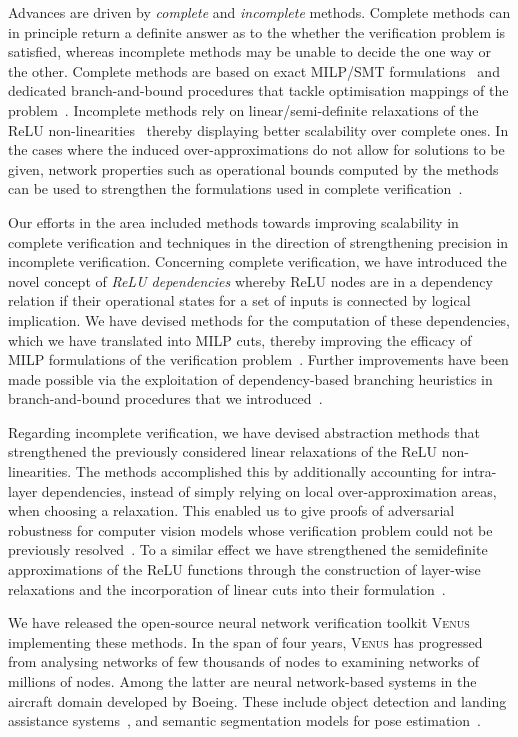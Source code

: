 \documentclass{article}
\newcommand{\venus}{\textsc{Venus}\xspace}
\begin{document}
Advances are driven by {\em complete} and {\em incomplete} methods.  Complete
methods can in principle return a definite answer as to the whether the
verification problem is satisfied, whereas incomplete methods may be unable to
decide the one way or the other. Complete methods are based on exact MILP/SMT 
formulations~\cite{Bastani+16,Katz+17} and dedicated branch-and-bound procedures
that tackle optimisation mappings of the problem~\cite{Bunel+18}.  Incomplete
methods rely on linear/semi-definite relaxations of the  ReLU
non-linearities~\cite{WongKolter17,RaghunathanSteinhardtLiang18} thereby
displaying better scalability over complete ones. In the cases where the
induced over-approximations  do not allow for solutions to be given, network
properties such as operational bounds computed by the methods can be used to
strengthen the formulations used in complete verification~\cite{Botoeva+20}.


Our efforts in the area included methods towards improving scalability in
complete verification and techniques in the direction of strengthening
precision in incomplete verification. Concerning complete verification, we have
introduced the novel concept of {\em ReLU dependencies} whereby ReLU nodes are
in a dependency relation if their operational states for a set of inputs is
connected by logical implication.  We have devised methods for the computation
of these dependencies, which we  have translated into MILP cuts, thereby
improving the efficacy of MILP formulations of the verification
problem~\cite{Botoeva+20}.  Further improvements have been made possible via
the exploitation of dependency-based branching heuristics  in branch-and-bound
procedures that we introduced~\cite{KouvarosLomuscio21}.


Regarding incomplete verification, we have devised abstraction methods that
strengthened the previously considered linear relaxations of the ReLU
non-linearities. The methods accomplished this by  additionally accounting for
intra-layer dependencies, instead of simply relying on local over-approximation
areas, when choosing a relaxation. This enabled us to give proofs of
adversarial robustness for computer vision models whose verification problem
could not be previously resolved~\cite{HashemiKouvarosLomuscio21}. To a similar
effect we have strengthened the semidefinite approximations of the ReLU
functions through  the construction of layer-wise relaxations and the
incorporation of linear cuts into their formulation~\cite{Batten+21}.

We have released the open-source neural network verification toolkit \venus
implementing these methods.  In the span of four years, \venus has
progressed from analysing networks of few thousands of nodes to examining
networks of millions of nodes. Among the latter are neural network-based systems
in the aircraft domain developed by Boeing. These  include object detection and
landing assistance systems~\cite{Kouvaros+21}, and semantic segmentation models
for pose estimation~\cite{Kouvaros+23}.
\end{document}
